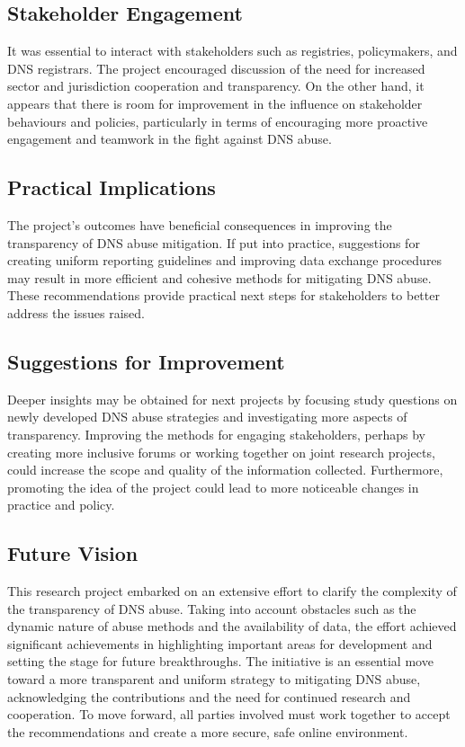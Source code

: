 \subsection{Stakeholder Engagement}

It was essential to interact with stakeholders such as registries, policymakers, and DNS registrars. The project encouraged discussion of the need for increased sector and jurisdiction cooperation and transparency. On the other hand, it appears that there is room for improvement in the influence on stakeholder behaviours and policies, particularly in terms of encouraging more proactive engagement and teamwork in the fight against DNS abuse.

\subsection{Practical Implications}
The project's outcomes have beneficial consequences in improving the transparency of DNS abuse mitigation. If put into practice, suggestions for creating uniform reporting guidelines and improving data exchange procedures may result in more efficient and cohesive methods for mitigating DNS abuse. These recommendations provide practical next steps for stakeholders to better address the issues raised.

\subsection{Suggestions for Improvement}

Deeper insights may be obtained for next projects by focusing study questions on newly developed DNS abuse strategies and investigating more aspects of transparency. Improving the methods for engaging stakeholders, perhaps by creating more inclusive forums or working together on joint research projects, could increase the scope and quality of the information collected. Furthermore, promoting the idea of the project could lead to more noticeable changes in practice and policy.

\subsection{Future Vision}

This research project embarked on an extensive effort to clarify the complexity of the transparency of DNS abuse. Taking into account obstacles such as the dynamic nature of abuse methods and the availability of data, the effort achieved significant achievements in highlighting important areas for development and setting the stage for future breakthroughs. The initiative is an essential move toward a more transparent and uniform strategy to mitigating DNS abuse, acknowledging the contributions and the need for continued research and cooperation. To move forward, all parties involved must work together to accept the recommendations and create a more secure, safe online environment.

